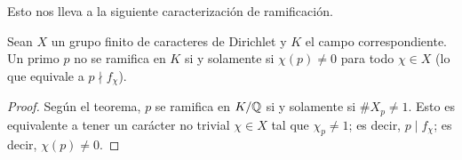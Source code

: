 Esto nos lleva a la siguiente caracterización de ramificación.

\begin{corolario}
  Sean $X$ un grupo finito de caracteres de Dirichlet y $K$ el campo
  correspondiente. Un primo $p$ no se ramifica en $K$ si y solamente si
  $\chi (p) \ne 0$ para todo $\chi \in X$ (lo que equivale a
  $p \nmid f_\chi$).

  \begin{proof}
    Según el teorema, $p$ se ramifica en $K/\mathbb{Q}$ si y solamente si
    $\# X_p \ne 1$. Esto es equivalente a tener un carácter no trivial
    $\chi \in X$ tal que $\chi_p \ne 1$; es decir, $p \mid f_\chi$;
    es decir, $\chi (p) \ne 0$.
  \end{proof}
\end{corolario}

